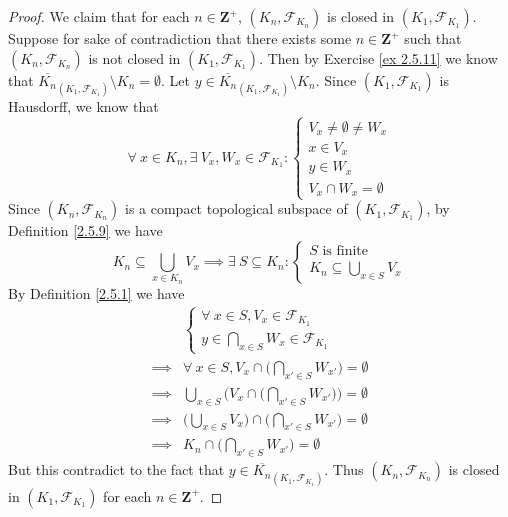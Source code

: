 \begin{proof}
    We claim that for each \(n \in \mathbf{Z}^+\), \((K_n, \mathcal{F}_{K_n})\) is closed in \((K_1, \mathcal{F}_{K_1})\).
    Suppose for sake of contradiction that there exists some \(n \in \mathbf{Z}^+\) such that \((K_n, \mathcal{F}_{K_n})\) is not closed in \((K_1, \mathcal{F}_{K_1})\).
    Then by Exercise \ref{ex 2.5.11} we know that \(\overline{K_n}_{(K_1, \mathcal{F}_{K_1})} \setminus K_n = \emptyset\).
    Let \(y \in \overline{K_n}_{(K_1, \mathcal{F}_{K_1})} \setminus K_n\).
    Since \((K_1, \mathcal{F}_{K_1})\) is Hausdorff, we know that
    \[
        \forall\ x \in K_n, \exists\ V_x, W_x \in \mathcal{F}_{K_1} : \begin{cases}
            V_x \neq \emptyset \neq W_x \\
            x \in V_x                   \\
            y \in W_x                   \\
            V_x \cap W_x = \emptyset
        \end{cases}
    \]
    Since \((K_n, \mathcal{F}_{K_n})\) is a compact topological subspace of \((K_1, \mathcal{F}_{K_1})\), by Definition \ref{2.5.9} we have
    \[
        K_n \subseteq \bigcup_{x \in K_n} V_x \implies \exists\ S \subseteq K_n : \begin{cases}
            S \text{ is finite} \\
            K_n \subseteq \bigcup_{x \in S} V_x
        \end{cases}
    \]
    By Definition \ref{2.5.1} we have
    \begin{align*}
                 & \begin{cases}
            \forall\ x \in S, V_x \in \mathcal{F}_{K_1} \\
            y \in \bigcap_{x \in S} W_x \in \mathcal{F}_{K_1}
        \end{cases}                                                              \\
        \implies & \forall\ x \in S, V_x \cap \bigg(\bigcap_{x' \in S} W_{x'}\bigg) = \emptyset             \\
        \implies & \bigcup_{x \in S} \Bigg(V_x \cap \bigg(\bigcap_{x' \in S} W_{x'}\bigg)\Bigg) = \emptyset \\
        \implies & \bigg(\bigcup_{x \in S} V_x\bigg) \cap \bigg(\bigcap_{x' \in S} W_{x'}\bigg) = \emptyset \\
        \implies & K_n \cap \bigg(\bigcap_{x' \in S} W_{x'}\bigg) = \emptyset
    \end{align*}
    But this contradict to the fact that \(y \in \overline{K_n}_{(K_1, \mathcal{F}_{K_1})}\).
    Thus \((K_n, \mathcal{F}_{K_n})\) is closed in \((K_1, \mathcal{F}_{K_1})\) for each \(n \in \mathbf{Z}^+\).


\end{proof}
